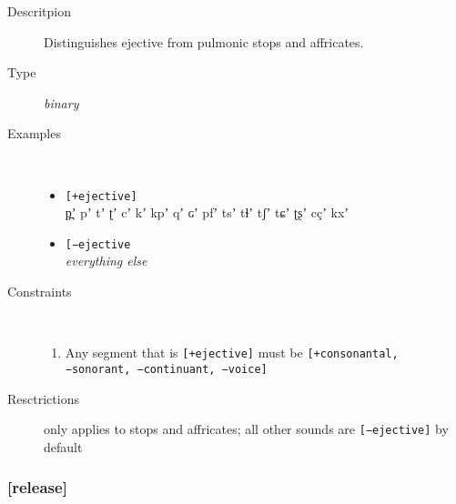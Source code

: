 \documentclass[10pt,letterpaper]{article}
\begin{document}
\begin{description}
\item[Descritpion] Distinguishes ejective from pulmonic stops and affricates.
\item[Type] \emph{binary}
\item[Examples]\
  \begin{itemize}
    \item \texttt{[+ejective]}\\
    p̪ʼ pʼ tʼ ʈʼ cʼ kʼ kpʼ qʼ ɢʼ pfʼ tsʼ tɬʼ tʃʼ tɕʼ ʈʂʼ cçʼ kxʼ
    \item \texttt{[−ejective}\\
    \emph{everything else}
  \end{itemize}
\item[Constraints]\
  \begin{enumerate}
    \item Any segment that is \texttt{[+ejective]} must be \texttt{[+consonantal, −sonorant, −continuant, −voice]}
  \end{enumerate}
  \item[Resctrictions] only applies to stops and affricates; all other sounds are \texttt{[−ejective]} by default
\end{description}

\subsubsection{[release]}
\label{ssub:feature_release}
\end{document}
